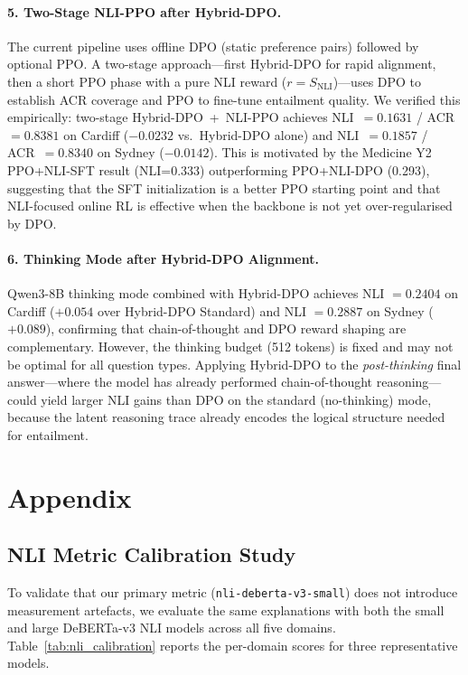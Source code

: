 \paragraph{5. Two-Stage NLI-PPO after Hybrid-DPO.}
The current pipeline uses offline DPO (static preference pairs) followed by optional PPO.
A two-stage approach---first Hybrid-DPO for rapid alignment, then a short PPO phase with a pure NLI reward ($r=S_\text{NLI}$)---uses DPO to establish ACR coverage and PPO to fine-tune entailment quality. We verified this empirically: two-stage Hybrid-DPO~+~NLI-PPO achieves NLI~$=0.1631$ / ACR~$=0.8381$ on Cardiff ($-0.0232$ vs.\ Hybrid-DPO alone) and NLI~$=0.1857$ / ACR~$=0.8340$ on Sydney ($-0.0142$).
This is motivated by the Medicine Y2 PPO+NLI-SFT result (NLI=0.333) outperforming PPO+NLI-DPO (0.293), suggesting that the SFT initialization is a better PPO starting point and that NLI-focused online RL is effective when the backbone is not yet over-regularised by DPO.

\paragraph{6. Thinking Mode after Hybrid-DPO Alignment.}
Qwen3-8B thinking mode combined with Hybrid-DPO achieves NLI $= 0.2404$ on Cardiff ($+0.054$ over Hybrid-DPO Standard) and NLI $= 0.2887$ on Sydney ($+0.089$), confirming that chain-of-thought and DPO reward shaping are complementary.
However, the thinking budget (512 tokens) is fixed and may not be optimal for all question types.
Applying Hybrid-DPO to the \emph{post-thinking} final answer---where the model has already performed chain-of-thought reasoning---could yield larger NLI gains than DPO on the standard (no-thinking) mode, because the latent reasoning trace already encodes the logical structure needed for entailment.

\section*{Appendix}

\subsection{NLI Metric Calibration Study}
\label{sec:nli_calibration}

To validate that our primary metric (\texttt{nli-deberta-v3-small}) does not introduce measurement artefacts, we evaluate the same explanations with both the small and large DeBERTa-v3 NLI models across all five domains. Table~\ref{tab:nli_calibration} reports the per-domain scores for three representative models.

